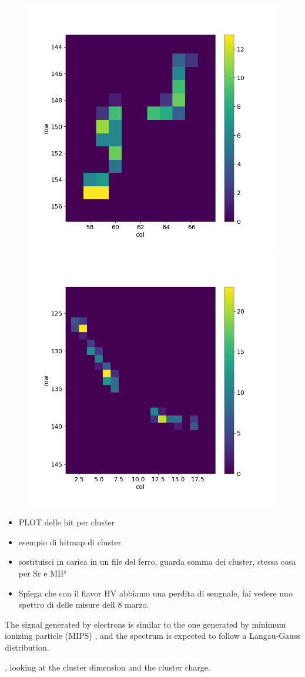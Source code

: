 \begin{figure}[h!]
            \includegraphics[width=.24\linewidth]{figures/charaterization/evts/Sr90/22a.png}
            \includegraphics[width=.24\linewidth]{figures/charaterization/evts/Sr90/25a.png}               
            \caption{ }
            \label{fig:hit_map_Sr90}
        \end{figure}         

        \begin{itemize}
            \item PLOT delle hit per cluster
            \item  esempio di hitmap di cluster
            \item sostituisci in carica in un file del ferro, guarda somma dei cluster, stessa cosa per Sr e MIP
            \item  Spiega che con il flavor HV abbiamo una perdita di sengnale, fai vedere uno spettro di delle misure dell 8 marzo. 
        \end{itemize}
        The signal generated by electrons is similar to the one generated by minimum ionizing particle (MIPS) , and the spectrum is expected to follow a Langau-Gauss distribution.
        
        , looking at the cluster dimension and the cluster charge.  


